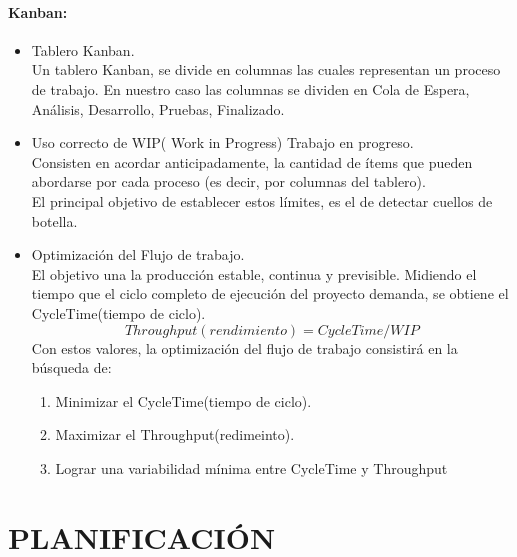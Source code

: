 \documentclass[11pt,letterpaper]{report}
\begin{document}
\subsubsection{Kanban:} 
\begin{itemize}
	\item Tablero Kanban.\\
	Un tablero Kanban, se divide en columnas las cuales representan un proceso de trabajo. En nuestro caso las columnas se dividen en Cola de Espera, Análisis, Desarrollo, Pruebas, Finalizado.
	\item Uso correcto de WIP( Work in Progress) Trabajo en progreso.\\
	Consisten en acordar anticipadamente, la cantidad de ítems que pueden abordarse por cada proceso (es decir, por columnas del tablero).\\
	El principal objetivo de establecer estos límites, es el de detectar cuellos de botella. 
	\item Optimización del Flujo de trabajo.\\
	El objetivo una la producción estable, continua y previsible. Midiendo el tiempo que el ciclo completo de ejecución del proyecto demanda, se obtiene el CycleTime(tiempo de ciclo).
	\begin{equation}
	Throughput(rendimiento) = CycleTime/WIP
	\end{equation}
	Con estos valores, la optimización del flujo de trabajo consistirá en la búsqueda de:
	\begin{enumerate}
		\item Minimizar el CycleTime(tiempo de ciclo).
		\item Maximizar el Throughput(redimeinto).
		\item Lograr una variabilidad mínima entre CycleTime y Throughput
	\end{enumerate}
\end{itemize}

\chapter{PLANIFICACIÓN}
\end{document}
